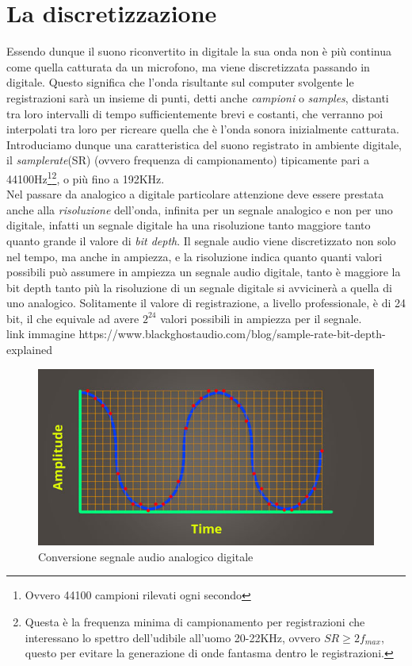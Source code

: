 \section{La discretizzazione}
Essendo dunque il suono riconvertito in digitale la sua onda non è più continua come quella catturata da un microfono, ma viene discretizzata passando in digitale. Questo significa che l'onda risultante sul computer svolgente le registrazioni sarà un insieme di punti, detti anche \emph{campioni} o \emph{samples}, distanti tra loro intervalli di tempo sufficientemente brevi e costanti, che verranno poi interpolati tra loro per ricreare quella che è l'onda sonora inizialmente catturata. Introduciamo dunque una caratteristica del suono registrato in ambiente digitale, il \emph{samplerate}(SR) (ovvero frequenza di campionamento) tipicamente pari a 44100Hz\footnote{Ovvero 44100 campioni rilevati ogni secondo}\footnote{Questa è la frequenza minima di campionamento per registrazioni che interessano lo spettro dell'udibile all'uomo 20-22KHz, ovvero $SR\ge2f_{max}$, questo per evitare la generazione di onde fantasma dentro le registrazioni.}, o più fino a 192KHz.\\
Nel passare da analogico a digitale particolare attenzione deve essere prestata anche alla \emph{risoluzione} dell'onda, infinita per un segnale analogico e non per uno digitale, infatti un segnale digitale ha una risoluzione tanto maggiore tanto quanto grande il valore di \emph{bit depth}. Il segnale audio viene discretizzato non solo nel tempo, ma anche in ampiezza, e la risoluzione indica quanto quanti valori possibili può assumere in ampiezza un segnale audio digitale, tanto è maggiore la bit depth tanto più la risoluzione di un segnale digitale si avvicinerà a quella di uno analogico. Solitamente il valore di registrazione, a livello professionale, è di 24 bit, il che equivale ad avere $2^{24}$ valori possibili in ampiezza per il segnale.\\
link immagine
https://www.blackghostaudio.com/blog/sample-rate-bit-depth-explained
\begin{figure}[h]
	\begin{center}
		\includegraphics[scale=0.5]{./immagini/SR-bitdepth.jpeg}
	\end{center}
	\caption{Conversione segnale audio analogico digitale}\label{fig:SR-bitdepth}
\end{figure}


